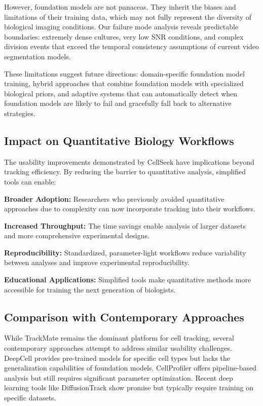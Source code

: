 \documentclass[12pt]{article}
\begin{document}
However, foundation models are not panaceas. They inherit the biases and limitations of their training data, which may not fully represent the diversity of biological imaging conditions. Our failure mode analysis reveals predictable boundaries: extremely dense cultures, very low SNR conditions, and complex division events that exceed the temporal consistency assumptions of current video segmentation models.

These limitations suggest future directions: domain-specific foundation model training, hybrid approaches that combine foundation models with specialized biological priors, and adaptive systems that can automatically detect when foundation models are likely to fail and gracefully fall back to alternative strategies.

\subsection{Impact on Quantitative Biology Workflows}

The usability improvements demonstrated by CellSeek have implications beyond tracking efficiency. By reducing the barrier to quantitative analysis, simplified tools can enable:

\textbf{Broader Adoption:} Researchers who previously avoided quantitative approaches due to complexity can now incorporate tracking into their workflows.

\textbf{Increased Throughput:} The time savings enable analysis of larger datasets and more comprehensive experimental designs.

\textbf{Reproducibility:} Standardized, parameter-light workflows reduce variability between analyses and improve experimental reproducibility.

\textbf{Educational Applications:} Simplified tools make quantitative methods more accessible for training the next generation of biologists.

\subsection{Comparison with Contemporary Approaches}

While TrackMate remains the dominant platform for cell tracking, several contemporary approaches attempt to address similar usability challenges. DeepCell provides pre-trained models for specific cell types but lacks the generalization capabilities of foundation models. CellProfiler offers pipeline-based analysis but still requires significant parameter optimization. Recent deep learning tools like DiffusionTrack show promise but typically require training on specific datasets.
\end{document}
